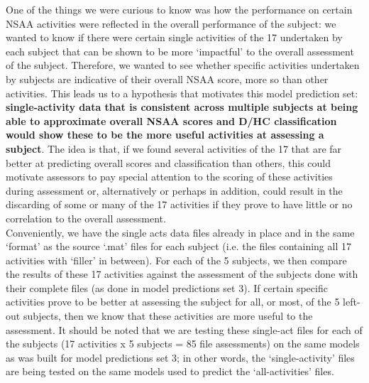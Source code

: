 \documentclass[12pt,twoside]{report}
\begin{document}
\quad One of the things we were curious to know was how the performance on certain NSAA activities were reflected in the overall performance of the subject: we wanted to know if there were certain single activities of the 17 undertaken by each subject that can be shown to be more ‘impactful’ to the overall assessment of the subject. Therefore, we wanted to see whether specific activities undertaken by subjects are indicative of their overall NSAA score, more so than other activities. This leads us to a hypothesis that motivates this model prediction set: \textbf{single-activity data that is consistent across multiple subjects at being able to approximate overall NSAA scores and D/HC classification would show these to be the more useful activities at assessing a subject}. The idea is that, if we found several activities of the 17 that are far better at predicting overall scores and classification than others, this could motivate assessors to pay special attention to the scoring of these activities during assessment or, alternatively or perhaps in addition, could result in the discarding of some or many of the 17 activities if they prove to have little or no correlation to the overall assessment.\\

\quad Conveniently, we have the single acts data files already in place and in the same ‘format’ as the source ‘.mat’ files for each subject (i.e. the files containing all 17 activities with ‘filler’ in between). For each of the 5 subjects, we then compare the results of these 17 activities against the assessment of the subjects done with their complete files (as done in model predictions set 3). If certain specific activities prove to be better at assessing the subject for all, or most, of the 5 left-out subjects, then we know that these activities are more useful to the assessment. It should be noted that we are testing these single-act files for each of the subjects (17 activities x 5 subjects = 85 file assessments) on the same models as was built for model predictions set 3; in other words, the ‘single-activity’ files are being tested on the same models used to predict the ‘all-activities’ files.\\
\end{document}
